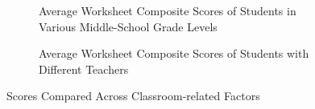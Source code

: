 \begin{figure}
     \centering
    \begin{subfigure}[t]{0.49\textwidth}
        \caption{Average \ts Worksheet Composite Scores of Students in Various Middle-School Grade Levels}
        \label{fig:grade_factors}
    \end{subfigure}
    \hfill
    \begin{subfigure}[t]{0.49\textwidth}
        \caption{Average \ts Worksheet Composite Scores of Students with Different Teachers}
        \label{fig:teacher_factors}
    \end{subfigure}
    \caption{\ts Scores Compared Across Classroom-related Factors}
    \label{fig:classroom_factors}
\end{figure}




